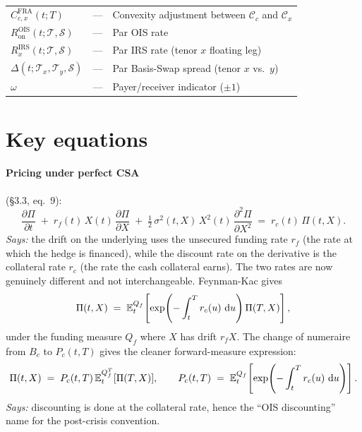 \documentclass[11pt,a4paper]{article}
\begin{document}
\begin{tabular}{@{}p{3cm}p{3.5cm}p{8.5cm}@{}}
$C^{\text{FRA}}_{c,x}(t; T)$ & ---                     & Convexity adjustment between $\mathcal{C}_c$ and $\mathcal{C}_x$ \\
$R^{\text{OIS}}_{\text{on}}(t; \mathcal{T}, \mathcal{S})$ & --- & Par OIS rate \\
$R^{\text{IRS}}_x(t; \mathcal{T}, \mathcal{S})$       & ---    & Par IRS rate (tenor $x$ floating leg) \\
$\Delta(t; \mathcal{T}_x, \mathcal{T}_y, \mathcal{S})$ & ---   & Par Basis-Swap spread (tenor $x$ vs.\ $y$) \\
$\omega$                 & ---                         & Payer/receiver indicator ($\pm 1$) \\
\bottomrule
\end{tabular}

\section{Key equations}

\paragraph{Pricing under perfect CSA} (\S3.3, eq.~9):
\begin{equation}\label{eq:mc-pde}
  \frac{\partial \Pi}{\partial t}
  \;+\; r_f(t)\, X(t)\, \frac{\partial \Pi}{\partial X}
  \;+\; \tfrac{1}{2}\, \sigma^2(t, X)\, X^2(t)\, \frac{\partial^2 \Pi}{\partial X^2}
  \;=\; r_c(t)\, \Pi(t, X).
\end{equation}
\textit{Says:} the drift on the underlying uses the unsecured
funding rate $r_f$ (the rate at which the hedge is financed), while
the discount rate on the derivative is the collateral rate $r_c$
(the rate the cash collateral earns). The two rates are now
genuinely different and not interchangeable. Feynman-Kac gives
\begin{equation}\label{eq:mc-fk}
  \Pi(t, X) \;=\; \mathbb{E}^{Q_f}_t\!\left[ \exp\!\left(-\int_t^T r_c(u)\,\,\mathrm{d} u\right) \Pi(T, X) \right],
\end{equation}
under the funding measure $Q_f$ where $X$ has drift $r_f X$. The
change of numeraire from $B_c$ to $P_c(t, T)$ gives the cleaner
forward-measure expression:
\begin{equation}\label{eq:mc-forward}
  \Pi(t, X) \;=\; P_c(t, T)\, \mathbb{E}^{Q_f^T}_t[\Pi(T, X)],
  \qquad
  P_c(t, T) \;=\; \mathbb{E}^{Q_f}_t\!\left[\exp\!\left(-\int_t^T r_c(u)\,\,\mathrm{d} u\right)\right].
\end{equation}
\textit{Says:} discounting is done at the collateral rate, hence the
``OIS discounting'' name for the post-crisis convention.
\end{document}
